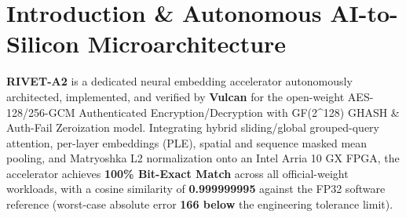 \documentclass[11pt,a4paper]{article}
\begin{document}
\section{Introduction \& Autonomous AI-to-Silicon Microarchitecture}

\textbf{RIVET-A2} is a dedicated neural embedding accelerator autonomously architected, implemented, and verified by \textbf{Vulcan} for the open-weight AES-128/\allowbreak{}256-GCM Authenticated Encryption/\allowbreak{}Decryption with GF(\allowbreak{}2\textasciicircum{}128)\allowbreak{} GHASH \& Auth-Fail Zeroization model. Integrating hybrid sliding/global grouped-query attention, per-layer embeddings (PLE), spatial and sequence masked mean pooling, and Matryoshka L2 normalization onto an Intel Arria 10 GX FPGA, the accelerator achieves \textbf{100\% Bit-Exact Match} across all official-weight workloads, with a cosine similarity of \textbf{0.999999995} against the FP32 software reference (worst-case absolute error \textbf{166\texttimes{} below} the engineering tolerance limit).

\vspace{2pt}
\end{document}
